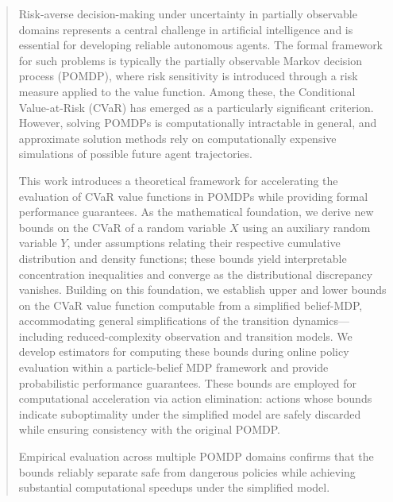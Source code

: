 \documentclass[acmlarge, manuscript, screen, review, natbib=false, oneside]{acmart}
\begin{document}
\begin{abstract}
    Risk-averse decision-making under uncertainty in partially observable domains represents a central challenge in artificial intelligence and is essential for developing reliable autonomous agents. The formal framework for such problems is typically the partially observable Markov decision process (POMDP), where risk sensitivity is introduced through a risk measure applied to the value function. Among these, the Conditional Value-at-Risk (CVaR) has emerged as a particularly significant criterion. However, solving POMDPs is computationally intractable in general, and approximate solution methods rely on computationally expensive simulations of possible future agent trajectories. 
    
    This work introduces a theoretical framework for accelerating the evaluation of CVaR value functions in POMDPs while providing formal performance guarantees. As the mathematical foundation, we derive new bounds on the CVaR of a random variable $X$ using an auxiliary random variable $Y$, under assumptions relating their respective cumulative distribution and density functions; these bounds yield interpretable concentration inequalities and converge as the distributional discrepancy vanishes. Building on this foundation, we establish upper and lower bounds on the CVaR value function computable from a simplified belief-MDP, accommodating general simplifications of the transition dynamics—including reduced-complexity observation and transition models. We develop estimators for computing these bounds during online policy evaluation within a particle-belief MDP framework and provide probabilistic performance guarantees. These bounds are employed for computational acceleration via action elimination: actions whose bounds indicate suboptimality under the simplified model are safely discarded while ensuring consistency with the original POMDP. 
    
    Empirical evaluation across multiple POMDP domains confirms that the bounds reliably separate safe from dangerous policies while achieving substantial computational speedups under the simplified model.
\end{abstract}



\maketitle
\end{document}

